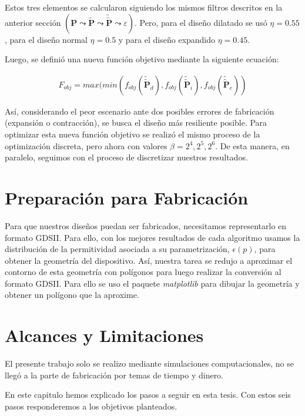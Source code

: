 Estos tres elementos se calcularon siguiendo los mismos filtros descritos en la anterior sección
$(\boldsymbol{P} \mathrel{\leadsto} \widetilde{\boldsymbol{P}} \mathrel{\leadsto}
\widetilde{\widetilde{\boldsymbol{P}}} \mathrel{\leadsto} \varepsilon)$.
Pero, para el diseño dilatado se usó $\eta = 0.55$, para el diseño normal $\eta = 0.5$ y
para el diseño expandido $\eta = 0.45$.

Luego, se definió una nueva función objetivo mediante la siguiente ecuación:

\begin{equation}
  \begin{split}
    F_{obj} = max(min(
    f_{obj}(\widetilde{\widetilde{\boldsymbol{P}}}_{d}),
    f_{obj}(\widetilde{\widetilde{\boldsymbol{P}}}_{i}),
    f_{obj}(\widetilde{\widetilde{\boldsymbol{P}}}_{e})
    )
  \end{split}
  \label{eq:final-fom}
\end{equation}

Así, considerando el peor escenario ante dos posibles errores de fabricación (expansión o contracción),
se busca el diseño más resiliente posible.
Para optimizar esta nueva función objetivo se realizó el mismo proceso de la optimización discreta, pero ahora
con valores $\beta = 2^4, 2^5, 2^6$. De esta manera, en paralelo, seguimos con el proceso de discretizar
nuestros resultados.

\section{Preparación para Fabricación}


Para que nuestros diseños puedan ser fabricados, necesitamos representarlo en formato GDSII.
Para ello, con los mejores resultados de cada algoritmo usamos la distribución de la permitividad asociada a su parametrización, $\epsilon(p)$,
para obtener la geometría del dispositivo.
Así, nuestra tarea se redujo a aproximar el contorno de esta geometría con polígonos para luego realizar la conversión al formato GDSII.
Para ello se uso el paquete \emph{matplotlib} para dibujar la geometría y obtener un polígono que la aproxime.

\section{Alcances y Limitaciones}

El presente trabajo solo se realizo mediante simulaciones computacionales, no se llegó a la parte de
fabricación por temas de tiempo y dinero.

En este capitulo hemos explicado los pasos a seguir en esta tesis. Con estos seis pasos responderemos a los
objetivos planteados.
